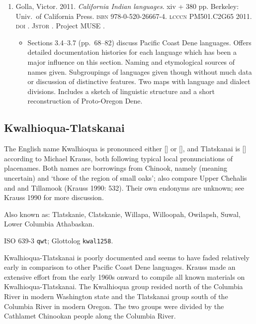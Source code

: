 \documentclass[12pt,letterpaper,oneside,article]{memoir}
\begin{document}
\begin{enumerate}
\item	Golla, Victor.
	2011.
	\textit{California Indian languages}.
	xiv + 380 pp.
	Berkeley: Univ.\ of California Press.
	\textsc{isbn} 978-0-520-26667-4.
	\textsc{lcccn} PM501.C2G65 2011.
	\textsc{doi} .
	\textsc{Jstor} .
	Project MUSE .
	\begin{itemize}
	\item	Sections 3.4–3.7 (pp.\ 68–82) discuss Pacific Coast Dene languages.
		Offers detailed documentation histories for each language which
		has been a major influence on this section.
		Naming and etymological sources of names given.
		Subgroupings of languages given though without much data or discussion
		of distinctive features.
		Two maps with language and dialect divisions.
		Includes a sketch of linguistic structure and a short reconstruction
		of Proto-Oregon Dene.
	\end{itemize}
\end{enumerate}

\subsection{Kwalhioqua-Tlatskanai}\label{sec:kt}

The English name Kwalhioqua is pronounced either [] or [], and Tlatskanai is [] according to Michael Krauss, both following typical local pronunciations of placenames.
Both names are borrowings from Chinook, namely  (meaning uncertain) and  ‘those of the region of small oaks’; also compare Upper Chehalis  and  and Tillamook  (Krauss 1990: 532).
Their own endonyms are unknown; see Krauss 1990 for more discussion.

Also known as: Tlatskanie, Clatskanie, Willapa, Willoopah, Owilapsh, Suwal, Lower Columbia Athabaskan.

ISO 639-3 \texttt{qwt}; Glottolog \texttt{kwal1258}.

Kwalhioqua-Tlatskanai is poorly documented and seems to have faded relatively early in comparison to other Pacific Coast Dene languages.
Krauss made an extensive effort from the early 1960s onward to compile all known materials on Kwalhioqua-Tlatskanai.
The Kwalhioqua group resided north of the Columbia River in modern Washington state and the Tlatskanai group south of the Columbia River in modern Oregon.
The two groups were divided by the Cathlamet Chinookan people along the Columbia River.
\end{document}
